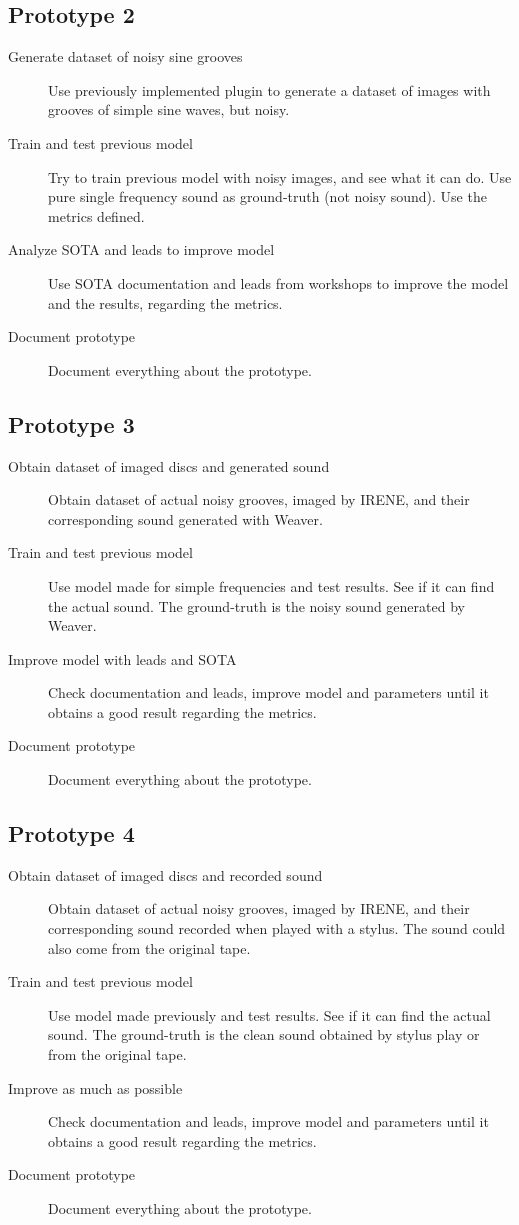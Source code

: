 \documentclass[12pt, twoside]{article}
\begin{document}
\subsection{Prototype 2}
\begin{description}
	\item[Generate dataset of noisy sine grooves] Use previously implemented plugin to generate a dataset of images with grooves of simple sine waves, but noisy.
	\item[Train and test previous model] Try to train previous model with noisy images, and see what it can do. Use pure single frequency sound as ground-truth (not noisy sound). Use the metrics defined.
	\item[Analyze SOTA and leads to improve model] Use SOTA documentation and leads from workshops to improve the model and the results, regarding the metrics.
	\item[Document prototype] Document everything about the prototype.
\end{description}
\subsection{Prototype 3}
\begin{description}
	\item[Obtain dataset of imaged discs and generated sound] Obtain dataset of actual noisy grooves, imaged by IRENE, and their corresponding sound generated with Weaver.
	\item[Train and test previous model] Use model made for simple frequencies and test results. See if it can find the actual sound. The ground-truth is the noisy sound generated by Weaver.
	\item[Improve model with leads and SOTA] Check documentation and leads, improve model and parameters until it obtains a good result regarding the metrics.
	\item[Document prototype] Document everything about the prototype.
\end{description}
\subsection{Prototype 4}
\begin{description}
    \item[Obtain dataset of imaged discs and recorded sound] Obtain dataset of actual noisy grooves, imaged by IRENE, and their corresponding sound recorded when played with a stylus. The sound could also come from the original tape.
    \item[Train and test previous model] Use model made previously and test results. See if it can find the actual sound. The ground-truth is the clean sound obtained by stylus play or from the original tape.
    \item[Improve as much as possible] Check documentation and leads, improve model and parameters until it obtains a good result regarding the metrics.
    \item[Document prototype] Document everything about the prototype.
\end{description}
\end{document}

